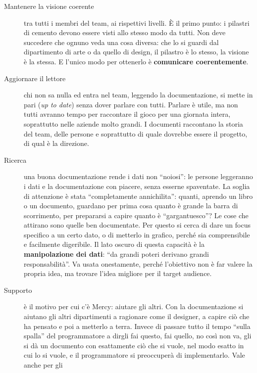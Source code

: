 \begin{description}
  \item[Mantenere la visione coerente] tra tutti i membri del team, ai
        rispettivi livelli. È il primo punto: i pilastri di cemento devono
        essere visti allo stesso modo da tutti. Non deve succedere che ognuno
        veda una cosa diversa: che lo si guardi dal dipartimento di arte o da
        quello di design, il pilastro è lo stesso, la visione è la stessa. E
        l'unico modo per ottenerlo è \textbf{comunicare coerentemente}.
  \item[Aggiornare il lettore] chi non sa nulla ed entra nel team, leggendo la
        documentazione, si mette in pari (\emph{up to date}) senza dover
        parlare con tutti. Parlare è utile, ma non tutti avranno tempo per
        raccontare il gioco per una giornata intera, soprattutto nelle aziende
        molto grandi. I documenti raccontano la storia del team, delle persone
        e soprattutto di quale dovrebbe essere il progetto, di qual è la
        direzione.
  \item[Ricerca] una buona documentazione rende i dati non ``noiosi'': le
        persone leggeranno i dati e la documentazione con piacere, senza
        esserne spaventate. La soglia di attenzione è stata ``completamente
        annichilita'': quanti, aprendo un libro o un documento, guardano per
        prima cosa quanto è grande la barra di scorrimento, per prepararsi a
        capire quanto è ``gargantuesco''? Le cose che attirano sono quelle ben
        documentate. Per questo si cerca di dare un focus specifico a un certo
        dato, o di metterlo in grafico, perché sia comprensibile e facilmente
        digeribile. Il lato oscuro di questa capacità è la
        \textbf{manipolazione dei dati}: ``da grandi poteri derivano grandi
        responsabilità''. Va usata onestamente, perché l'obiettivo non è far
        valere la propria idea, ma trovare l'idea migliore per il target
        audience.
  \item[Supporto] è il motivo per cui c'è Mercy: aiutare gli altri. Con la
        documentazione si aiutano gli altri dipartimenti a ragionare come il
        designer, a capire ciò che ha pensato e poi a metterlo a terra.
        Invece di passare tutto il tempo ``sulla spalla'' del programmatore a
        dirgli fai questo, fai quello, no così non va, gli si dà un documento
        con esattamente ciò che si vuole, nel modo esatto in cui lo si vuole,
        e il programmatore si preoccuperà di implementarlo. Vale anche per gli

\end{description}
